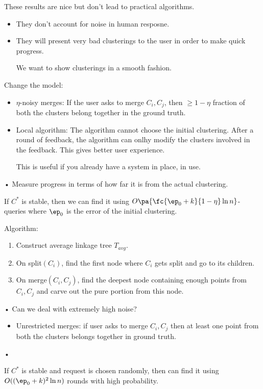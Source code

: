 These results are nice but don't lead to practical algorithms.
\begin{itemize}
\item
They don't account for noise in human resposne.
\item
They will present very bad clusterings to the user in order to make quick progress.

We want to show clusterings in a smooth fashion.
\end{itemize}
Change the model:
\begin{itemize}
\item
$\eta$-noisy merges: If the 
user asks to merge $C_i,C_j$, then $\ge 1-\eta$ fraction of both the clusters belong together in the ground truth.
\item
Local algorithm: The algorithm cannot choose the initial clustering. After a round of feedback, the algorithm can onlhy modify the clusters involved in the feedback. This gives better user experience.

This is useful if you already have a system in place, in use.
\end{itemize}•
Measure progress in terms of how far it is from the actual clustering.
\begin{thm}
If $C^*$ is stable, then we can find it using $O\pa{\fc{\ep_0+k}{1-\eta}\ln n}$-queries where $\ep_0$ is the error of the initial clustering. 
\end{thm}
Algorithm:
\begin{enumerate}
\item
Construct average linkage tree $T_{avg}$.
\item
On split$(C_i)$, find the first node where $C_i$ gets split and go to its children.
\item
On merge$(C_i,C_j)$, find the deepest node containing enough points from $C_i,C_j$ and carve out the pure portion from this node.
\end{enumerate}•
Can we deal with extremely high noise? 
\begin{itemize}
\item
Unrestricted merges: if user asks to merge $C_i,C_j$ then at least one point from both the clusters belongs together in ground truth.
\end{itemize}•
\begin{thm}
If $C^*$ is stable and request is chosen randomly, then can find it using $O((\ep_0+k)^2\ln n)$ rounds with high probability.
\end{thm}

